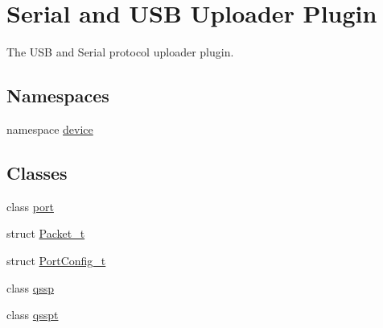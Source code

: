 \hypertarget{group___uploader}{\section{Serial and U\-S\-B Uploader Plugin}
\label{group___uploader}
}


The U\-S\-B and Serial protocol uploader plugin.  


\subsection*{Namespaces}
\begin{DoxyCompactItemize}
\item 
namespace \hyperlink{namespacedevice}{device}
\end{DoxyCompactItemize}
\subsection*{Classes}
\begin{DoxyCompactItemize}
\item 
class \hyperlink{classport}{port}
\item 
struct \hyperlink{struct_packet__t}{Packet\-\_\-t}
\item 
struct \hyperlink{struct_port_config__t}{Port\-Config\-\_\-t}
\item 
class \hyperlink{classqssp}{qssp}
\item 
class \hyperlink{classqsspt}{qsspt}
\end{DoxyCompactItemize}
